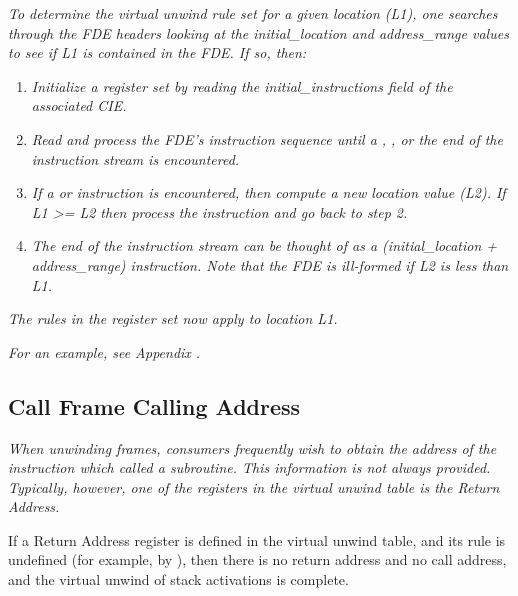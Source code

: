 \textit{To determine the virtual unwind rule set for a given location
(L1), one searches through the FDE headers looking at the
initial\_location and address\_range values to see if L1 is
contained in the FDE. If so, then:}
\begin{enumerate}[1. ]

\item \textit{Initialize a register set by reading the
initial\_instructions field of the associated CIE.}

\item \textit{Read and process the FDE\textquoteright s instruction
sequence until a , 
, or the
end of the instruction stream is encountered.}

\item \textit{ If a  or 
instruction is encountered, then compute a new location value
(L2). If L1 >= L2 then process the instruction and go back
to step 2.}

\item \textit{ The end of the instruction stream can be thought
of as a  (initial\_location + address\_range)
instruction. Note that the FDE is ill-formed if L2 is less
than L1.}

\end{enumerate}

\textit{The rules in the register set now apply to location L1.}

\textit{For an example, see 
Appendix .}



\subsection{Call Frame Calling Address}
\label{chap:callframecallingaddress}

\textit{When unwinding frames, consumers frequently wish to obtain the
address of the instruction which called a subroutine. This
information is not always provided. Typically, however,
one of the registers in the virtual unwind table is the
Return Address.}

If a Return Address register is defined in the virtual
unwind table, and its rule is undefined (for example, by
), then there is no return address and no
call address, and the virtual unwind of stack activations
is complete.


